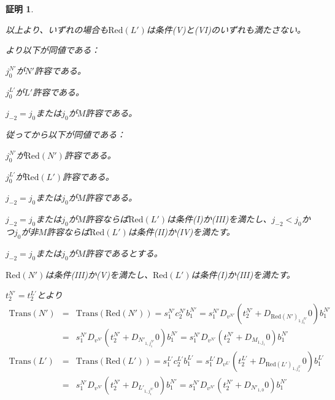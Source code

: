 \documentclass[dvipdfmx,uplatex]{jsarticle}
\theoremstyle{customnonumberbreakfortheorem}
\theoremstyle{customnonumberbreakforproof}
\newtheorem{hideableproof}{証明}
\begin{document}
\begin{hideableproof}
\begin{indented}
		\item 以上より、いずれの場合も\(\textrm{Red}(L')\)は条件(V)と(VI)のいずれも満たさない。
		\item {}より以下が同値である：
		\begin{penumerate}
			\item \(j_0^{N'}\)が\(N'\)許容である。
			\item \(j_0^{L'}\)が\(L'\)許容である。
			\item \(j_{-2} = j_0\)または\(j_0\)が\(M\)許容である。
		\end{penumerate}
		\item 従ってから以下が同値である：
		\begin{penumerate}
			\item \(j_0^{N'}\)が\(\textrm{Red}(N')\)許容である。
			\item \(j_0^{L'}\)が\(\textrm{Red}(L')\)許容である。
			\item \(j_{-2} = j_0\)または\(j_0\)が\(M\)許容である。
		\end{penumerate}
		\item \(j_{-2} = j_0\)または\(j_0\)が\(M\)許容ならば\(\textrm{Red}(L')\)は条件(I)か(III)を満たし、\(j_{-2} < j_0\)かつ\(j_0\)が非\(M\)許容ならば\(\textrm{Red}(L')\)は条件(II)か(IV)を満たす。
		\item
		\item \(j_{-2} = j_0\)または\(j_0\)が\(M\)許容であるとする。
		\begin{indented}
			\item \(\textrm{Red}(N')\)は条件(III)か(V)を満たし、\(\textrm{Red}(L')\)は条件(I)か(III)を満たす。
			\item \(t_2^{N'} = t_2^{L'}\)とより
			\begin{eqnarray*}
			\textrm{Trans}(N') & = & \textrm{Trans}(\textrm{Red}(N')) = s_1^{N'} c_2^{N'} b_1^{N'} = s_1^{N'} D_{v^{N'}}(t_2^{N'} + D_{\textrm{Red}(N')_{1.j_1^{N'}}} 0) b_1^{N'} \\
			& = & s_1^{N'} D_{v^{N'}}(t_2^{N'} + D_{N'_{1,j_1^{N'}}} 0) b_1^{N'} = s_1^{N'} D_{v^{N'}}(t_2^{N'} + D_{M_{1,j_1}} 0) b_1^{N'} \\
			\textrm{Trans}(L') & = & \textrm{Trans}(\textrm{Red}(L')) = s_1^{L'} c_2^{L'} b_1^{L'} = s_1^{L'} D_{v^{L'}}(t_2^{L'} + D_{\textrm{Red}(L')_{1,j_1^{L'}}} 0) b_1^{L'} \\
			& = & s_1^{N'} D_{v^{N'}}(t_2^{N'} + D_{L'_{1,j_1^{N'}}} 0) b_1^{N'} = s_1^{N'} D_{v^{N'}}(t_2^{N'} + D_{N'_{1,0}} 0) b_1^{N'} \\

\end{eqnarray*}
\end{indented}
\end{indented}
\end{hideableproof}
\end{document}
